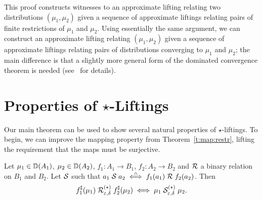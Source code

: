 \documentclass{lmcs}
\begin{document}
This proof constructs witnesses to an approximate lifting relating two
distributions $(\mu_1, \mu_2)$ given a sequence of approximate liftings relating
pairs of finite restrictions of $\mu_1$ and $\mu_2$. Using essentially the same
argument, we can construct an approximate lifting relating $(\mu_1, \mu_2)$
given a sequence of approximate liftings relating pairs of distributions
converging to $\mu_1$ and $\mu_2$; the main difference is that a slightly more
general form of the dominated convergence theorem is needed (see~\citet[Lemma
5.1.7]{JHThesis} for details).

\section{%
\texorpdfstring
{Properties of $\star$-Liftings}
{Properties of *-Liftings}} \label{s:props}

Our main theorem can be used to show several natural properties of
$\star$-liftings. To begin, we can improve the mapping property from
Theorem~\ref{t:map:restr}, lifting the requirement that the maps must be
surjective.

\begin{lem} \label{l:alift:map}
  Let $\mu_1 \in {\mathbb{D}}(A_1)$, $\mu_2 \in {\mathbb{D}}(A_2)$,
  $f_1 : A_1 \to B_1$, $f_2 : A_2 \to B_2$ and $\mathrel{\mathcal{R}}$ a binary relation
  on $B_1$ and $B_2$. Let $\mathrel{\mathcal{S}}$ such that $a_1 \mathrel{\mathrel{\mathcal{S}}} a_2
    \mathrel{\stackrel{\scriptscriptstyle \triangle}{\iff}} f_1(a_1) \mathrel{\mathcal{R}} f_2(a_2)$. Then
  \[
    f_1^{\sharp}(\mu_1) \mathrel{\mathrel{\mathcal{R}}^{(\star)}_{\varepsilon,\delta}} f_2^{\sharp}(\mu_2)
    \iff
    \mu_1 \mathrel{\mathrel{\mathcal{S}}^{(\star)}_{\varepsilon,\delta}} \mu_2 .
  \]
\end{lem}
\end{document}
